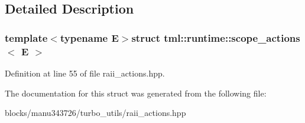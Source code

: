 \subsection{Detailed Description}
\subsubsection*{template$<$typename E$>$struct tml\+::runtime\+::scope\+\_\+actions$<$ E $>$}



Definition at line 55 of file raii\+\_\+actions.\+hpp.



The documentation for this struct was generated from the following file\+:\begin{DoxyCompactItemize}
\item 
blocks/manu343726/turbo\+\_\+utils/raii\+\_\+actions.\+hpp\end{DoxyCompactItemize}

